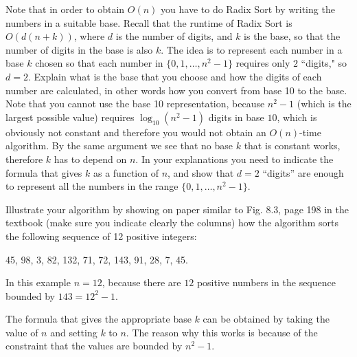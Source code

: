 \documentclass[11pt]{article}
\begin{document}
Note that in order to obtain $O(n)$ you have to do Radix Sort by writing the numbers in a suitable base.  Recall that the runtime of Radix Sort is $O(d (n+k))$, where $d$ is the number of digits, and $k$ is the base, so that the number of digits in the base is also $k$. The idea is to represent each number in a base $k$ chosen so that  each number in $\{0,1, \ldots, n^2-1\}$  requires only $2$ ``digits," so $d=2$.   Explain what is the base that you choose and  how the digits of each number are calculated, in other words how you convert from base 10 to the base.  Note that you cannot use the base 10 representation, because $n^2-1$ (which is the largest possible value) requires $\log_{10} (n^2-1)$ digits in base $10$, which is obviously not constant and therefore you would not obtain an $O(n)$-time algorithm.   By the same argument we see that no base $k$ that is constant works, therefore $k$ has to depend on $n$.   In your explanations you need to indicate the formula that gives $k$ as a function of $n$, and show that $d=2$ ``digits'' are enough to represent all the numbers in the range $\{0,1, \ldots, n^2-1\}$.

Illustrate your algorithm by showing on paper similar to Fig. 8.3, page 198 in the textbook (make sure you indicate clearly the columns)  how the algorithm sorts the following sequence of 12 positive integers:

45, 98, 3, 82, 132, 71, 72, 143, 91, 28, 7, 45.

In this example $n=12$, because there are $12$ positive numbers in the sequence bounded by $143 = 12^2 - 1$.

The formula that gives the appropriate base $k$ can be obtained by taking the value of $n$ and setting $k$ to $n$. The reason why this works is because of the constraint that the values are bounded by \(n^{2}-1\).
\end{document}
